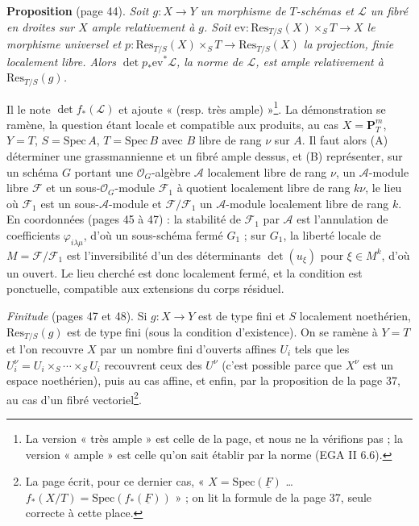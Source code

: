 \documentclass[11pt,a4paper]{article}
\begin{document}
\textbf{Proposition} (page 44). \emph{Soit $g : X \to Y$ un morphisme de
$T$-schémas et $\mathcal{L}$ un fibré en droites sur $X$ ample relativement à
$g$. Soit $\mathrm{ev} : \mathrm{Res}_{T/S}(X) \times_S T \to X$ le morphisme
universel et $p : \mathrm{Res}_{T/S}(X) \times_S T \to \mathrm{Res}_{T/S}(X)$ la
projection, finie localement libre. Alors $\det p_{*}\mathrm{ev}^{*}\mathcal{L}$,
la norme de $\mathcal{L}$, est ample relativement à $\mathrm{Res}_{T/S}(g)$.}

Il le note $\det f_{*}(\mathcal{L})$ et ajoute « (resp. très ample) »\footnote{La
version « très ample » est celle de la page, et nous ne la vérifions pas ;
la version « ample » est celle qu'on sait établir par la norme (EGA II 6.6).}.
La démonstration se ramène, la question étant locale et compatible aux
produits, au cas $X = \mathbf{P}^m_T$, $Y = T$, $S = \mathrm{Spec}\,A$, $T =
\mathrm{Spec}\,B$ avec $B$ libre de rang $\nu$ sur $A$. Il faut alors (A)
déterminer une grassmannienne et un fibré ample dessus, et (B) représenter,
sur un schéma $G$ portant une $\mathcal{O}_G$-algèbre $\mathcal{A}$ localement
libre de rang $\nu$, un $\mathcal{A}$-module libre $\mathcal{F}$ et un
sous-$\mathcal{O}_G$-module $\mathcal{F}_1$ à quotient localement libre de rang
$k\nu$, le lieu où $\mathcal{F}_1$ est un sous-$\mathcal{A}$-module et
$\mathcal{F}/\mathcal{F}_1$ un $\mathcal{A}$-module localement libre de rang $k$.
En coordonnées (pages 45 à 47) : la stabilité de $\mathcal{F}_1$ par
$\mathcal{A}$ est l'annulation de coefficients $\varphi_{i\lambda\mu}$, d'où un
sous-schéma fermé $G_1$ ; sur $G_1$, la liberté locale de $M =
\mathcal{F}/\mathcal{F}_1$ est l'inversibilité d'un des déterminants
$\det(u_\xi)$ pour $\xi \in M^k$, d'où un ouvert. Le lieu cherché est donc
localement fermé, et la condition est ponctuelle, compatible aux extensions du
corps résiduel.

\emph{Finitude} (pages 47 et 48). Si $g : X \to Y$ est de type fini et $S$
localement noethérien, $\mathrm{Res}_{T/S}(g)$ est de type fini (sous la
condition d'existence). On se ramène à $Y = T$ et l'on recouvre $X$ par un
nombre fini d'ouverts affines $U_i$ tels que les $U_i^{\nu} = U_i \times_S \cdots
\times_S U_i$ recouvrent ceux des $U^{\nu}$ (c'est possible parce que $X^{\nu}$
est un espace noethérien), puis au cas affine, et enfin, par la proposition de
la page 37, au cas d'un fibré vectoriel\footnote{La page écrit, pour ce
dernier cas, « $X = \mathrm{Spec}(\underline{F})$ \ldots{} $f_{*}(X/T) =
\mathrm{Spec}(f_{*}(\underline{F}))$ » ; on lit la formule de la page 37, seule
correcte à cette place.}.
\end{document}
